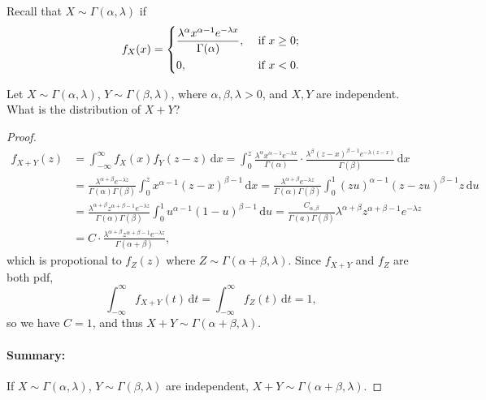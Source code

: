 Recall that \(X \sim \Gamma (\alpha , \lambda )\) if 
\[
    f_X(x) = \begin{dcases}
        \frac{\lambda ^\alpha x^{\alpha - 1} e^{-\lambda x}}{\Gamma (\alpha )}, &\text{ if } x \ge 0 ;\\
        0, &\text{ if } x < 0.
    \end{dcases}
\] 
\begin{eg}
    Let \(X \sim \Gamma (\alpha , \lambda )\), \(Y \sim \Gamma (\beta , \lambda )\), where \(\alpha , \beta , \lambda > 0\), and \(X, Y\) are independent. What is the distribution of \(X + Y\)?     
\end{eg}
\begin{proof}
    \begin{align*}
        f_{X + Y}(z) &= \int _{-\infty }^{\infty } f_X(x) f_Y(z - z) \, \mathrm{d} x = \int _0^z \frac{\lambda ^\alpha x^{\alpha - 1} e^{-\lambda x}}{\Gamma (\alpha )} \cdot \frac{\lambda ^\beta (z - x)^{\beta - 1} e^{-\lambda (z - x)}}{\Gamma (\beta )} \, \mathrm{d} x \\
        &= \frac{\lambda ^{\alpha + \beta} e^{-\lambda z}}{\Gamma (\alpha ) \Gamma (\beta )} \int _0^z x^{\alpha - 1} (z - x)^{\beta - 1} \, \mathrm{d} x = \frac{\lambda ^{\alpha + \beta} e^{-\lambda z}}{\Gamma (\alpha ) \Gamma (\beta )} \int _0^1 (zu)^{\alpha - 1} (z - zu)^{\beta - 1} z \, \mathrm{d} u \\
        &= \frac{\lambda ^{\alpha + \beta } z^{\alpha + \beta - 1} e^{-\lambda z}}{\Gamma (\alpha ) \Gamma (\beta )} \int _0^1 u^{\alpha - 1} (1 - u)^{\beta - 1} \, \mathrm{d} u = \frac{C_{\alpha , \beta}}{\Gamma (a) \Gamma (\beta )} \lambda ^{\alpha + \beta } z^{\alpha + \beta - 1} e^{-\lambda z} \\
        &= C \cdot \frac{\lambda ^{\alpha + \beta } z^{\alpha + \beta - 1} e^{-\lambda z}}{\Gamma (\alpha + \beta )},    
    \end{align*}
    which is propotional to \(f_Z(z)\) where \(Z \sim \Gamma (\alpha + \beta , \lambda )\). Since \(f_{X+Y}\) and \(f_Z\) are both pdf,
    \[
        \int _{-\infty }^{\infty } f_{X+Y}(t) \, \mathrm{d} t = \int _{-\infty }^{\infty} f_Z(t) \, \mathrm{d} t = 1,  
    \]
    so we have \(C = 1\), and thus \(X+Y \sim \Gamma (\alpha + \beta , \lambda )\). 

    \paragraph{Summary:} If \(X \sim \Gamma (\alpha , \lambda )\), \(Y \sim \Gamma (\beta , \lambda )\) are independent, \(X+Y \sim \Gamma (\alpha + \beta , \lambda )\).       
\end{proof}

